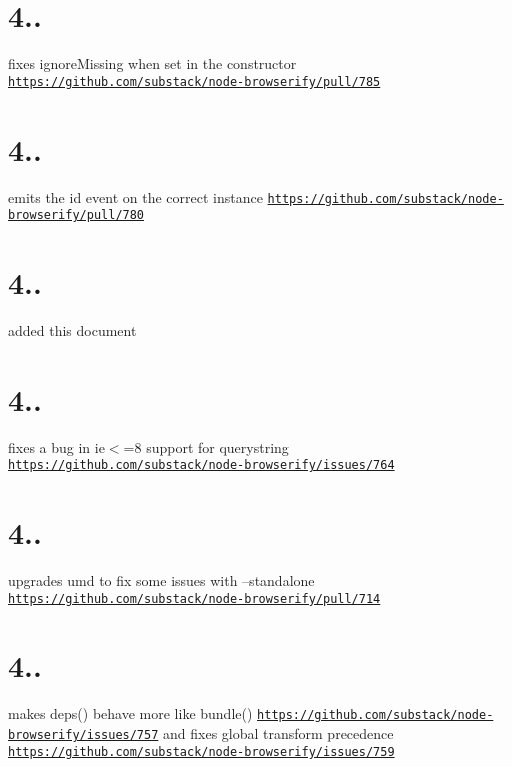 \section*{4..}

fixes ignore\+Missing when set in the constructor \href{https://github.com/substack/node-browserify/pull/785}{\tt https\+://github.\+com/substack/node-\/browserify/pull/785}

\section*{4..}

emits the \textquotesingle{}id\textquotesingle{} event on the correct instance \href{https://github.com/substack/node-browserify/pull/780}{\tt https\+://github.\+com/substack/node-\/browserify/pull/780}

\section*{4..}

added this document

\section*{4..}

fixes a bug in {\ttfamily ie$<$=8} support for querystring \href{https://github.com/substack/node-browserify/issues/764}{\tt https\+://github.\+com/substack/node-\/browserify/issues/764}

\section*{4..}

upgrades umd to fix some issues with --standalone \href{https://github.com/substack/node-browserify/pull/714}{\tt https\+://github.\+com/substack/node-\/browserify/pull/714}

\section*{4..}

makes deps() behave more like bundle() \href{https://github.com/substack/node-browserify/issues/757}{\tt https\+://github.\+com/substack/node-\/browserify/issues/757} and fixes global transform precedence \href{https://github.com/substack/node-browserify/issues/759}{\tt https\+://github.\+com/substack/node-\/browserify/issues/759}


